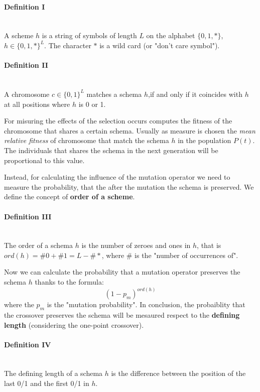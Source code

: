 \documentclass{article}
\begin{document}
\paragraph{Definition I}\mbox{}\\
A scheme $h$ is a string of symbols of length $L$ on the alphabet $\{0,1,*\}$, $h\in\{0,1,*\}^L$. The character
$*$ is a wild card (or "don't care symbol").

\paragraph{Definition II}\mbox{}\\
A chromosome $c\in\{0,1\}^L$ matches a schema $h$,if and only if it coincides
with $h$ at all positions where $h$ is 0 or 1.

For misuring the effects of the selection occurs computes the fitness of the chromosome that
shares a certain schema. Usually as measure is chosen the \textit{mean relative fitness}
of chromosome that match the schema $h$ in the population $P(t)$. The individuals that shares
the schema in the next generation will be proportional to this value.

Instead, for calculating the influence of the mutation operator we need to measure the probability,
that the after the mutation the schema is preserved. We define the concept of \textbf{order of
a scheme}.
\paragraph{Definition III}\mbox{}\\
The order of a schema $h$ is the number of zeroes and ones in $h$, that is $ord(h)=\#0+\#1=L-\#*$,
where $\#$ is the "number of occurrences of".

Now we can calculate the probability that a mutation operator preserves the schema $h$ thanks
to the formula:
$$(1-p_m)^{ord(h)}$$
where the $p_m$ is the "mutation probability". In conclusion, the probaiblity that the crossover
preserves the schema will be mesaured respect to the \textbf{defining length} (considering
the one-point crossover).

\paragraph{Definition IV}\mbox{}\\
The defining length of a schema $h$ is the difference between the position of the last 0/1
and the first 0/1 in $h$.
\end{document}
